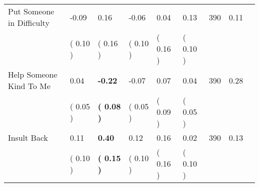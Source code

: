 \begin{tabular}{L{6.2cm} C{1.8cm} C{1.8cm} C{1.8cm} C{1.8cm} C{1.8cm} C{1.8cm} C{0.3cm} C{0.3cm}}
Put Someone in Difficulty &     -0.09 &      0.16 &     -0.06 &      0.04 &      0.13  & 390 &       0.11 \\ 
 & (     0.10 ) & (     0.16 ) & (     0.10 ) & (     0.16 ) & (     0.10 )  & \\
Help Someone Kind To Me &      0.04 & \textbf{    -0.22} &     -0.07 &      0.07 &      0.04  & 390 &       0.28 \\ 
 & (     0.05 ) & \textbf{(     0.08 )} & (     0.05 ) & (     0.09 ) & (     0.05 )  & \\
Insult Back &      0.11 & \textbf{     0.40} &      0.12 &      0.16 &      0.02  & 390 &       0.13 \\ 
 & (     0.10 ) & \textbf{(     0.15 )} & (     0.10 ) & (     0.16 ) & (     0.10 )  & \\
\bottomrule
\end{tabular}
